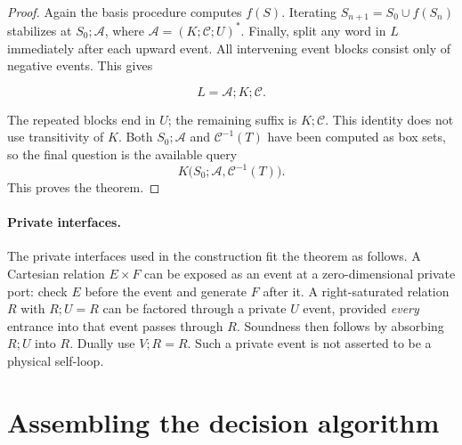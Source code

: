 \documentclass[11pt,a4paper]{article}
\theoremstyle{remark}
\begin{document}
\begin{proof}
Again the basis procedure computes \(f(S)\). Iterating \(S_{n+1}=S_0\cup f(S_n)\) stabilizes at \(S_0;\mathcal A\), where \(\mathcal A=(K;\mathcal C;U)^*\). Finally, split any word in \(L\) immediately after each upward
event. All intervening event blocks consist only of negative events.
This gives

\begin{equation}
L=\mathcal A;K;\mathcal C. \label{eq:factorization}
\end{equation}


The repeated blocks end in \(U\); the remaining suffix is
\(K;\mathcal C\). This identity does not use transitivity of \(K\).
Both \(S_0;\mathcal A\) and \(\mathcal C^{-1}(T)\) have been
computed as box sets, so the final question is the available query
\[
 K\bigl(S_0;\mathcal A,\mathcal C^{-1}(T)\bigr).
\]
This proves the theorem.

\end{proof}

\paragraph{Private interfaces.}

The private interfaces used in the construction fit the theorem as follows. A Cartesian relation \(E\times F\) can be exposed as an event at a zero-dimensional private port: check \(E\) before the event and generate \(F\) after it. A right-saturated relation \(R\) with \(R;U=R\) can be factored through a private \(U\) event, provided \emph{every} entrance into that event passes through \(R\). Soundness then follows by absorbing \(R;U\) into \(R\). Dually use \(V;R=R\). Such a private event is not asserted to be a physical self-loop.


\section{Assembling the decision algorithm}\label{sec:conclusion}
\end{document}
